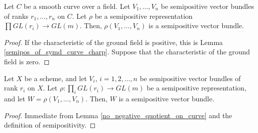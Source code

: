 \begin{lemma}\label{no_negative_quotient_on_curve}
Let $C$ be a smooth curve over a field. Let $V_1,\ldots,V_n$ be semipositive vector bundles of ranks $r_1,\ldots,r_n$ on $C$. Let $\rho$ be a semipositive representation $\prod GL(r_i)\to GL(m)$. Then, $\rho(V_1,\ldots,V_n)$ is a semipositive vector bundle.
\end{lemma}
\begin{proof}
If the characteristic of the ground field is positive, this is Lemma \ref{semipos_of_symd_curve_charp}. Suppose that the characteristic of the ground field is zero.
\end{proof}


\begin{lemma}\label{apply_rho_still_semipos}
Let $X$ be a scheme, and let $V_i$, $i=1,2,\ldots,n$ be semipositive vector bundles of rank $r_i$ on $X$. 
Let $\rho:\prod_i GL(r_i)\to GL(m)$ be a semipositive representation, and let $W=\rho(V_1,\ldots,V_n)$. 
Then, $W$ is a semipositive vector bundle.
\end{lemma}

\begin{proof}
Immediate from Lemma \ref{no_negative_quotient_on_curve} and the definition of semipositivity.
\end{proof}

